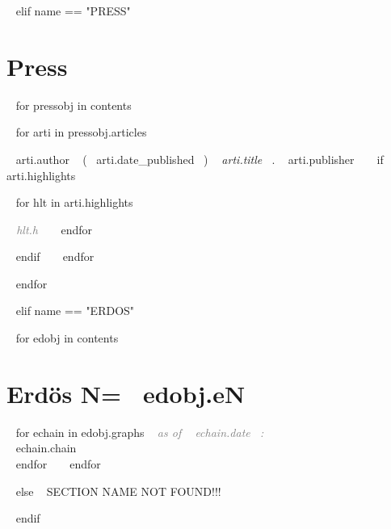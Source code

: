 ~{ elif name == "PRESS" }~

\section{Press}

~{ for pressobj in contents }~ 
\begin{etaremune}[itemindent=-1.5\bibhang, topsep=0pt,
				   itemsep=\bibsep,partopsep=0pt,parsep=0pt,leftmargin={\bibhang+\widthof{[999]}}] 
    
    ~{ for arti in pressobj.articles }~
    \item ~{{ arti.author }}~ (~{{ arti.date_published }}~) \textit{~{{ arti.title }}~}. ~{{ arti.publisher }}~
     ~{ if arti.highlights }~
     	\begin{innerlist}
     	~{ for hlt in arti.highlights }~
	     \item  \textcolor{grey}{\textit{~{{ hlt.h }}~} }
     	~{ endfor }~
     	\end{innerlist}
     ~{ endif }~
	~{ endfor }~


\end{etaremune}
~{ endfor }~



%
%



~{ elif name == "ERDOS" }~

~{ for edobj in contents }~
\section{Erdös N=~{{ edobj.eN }}~}
~{ for echain in edobj.graphs }~
\textit{\textcolor{grey}{as of ~{{ echain.date }}~:}}\\
~{{ echain.chain }}~\\

~{ endfor }~
~{ endfor }~


~{ else }~
SECTION NAME NOT FOUND!!!


~{ endif }~


%	




